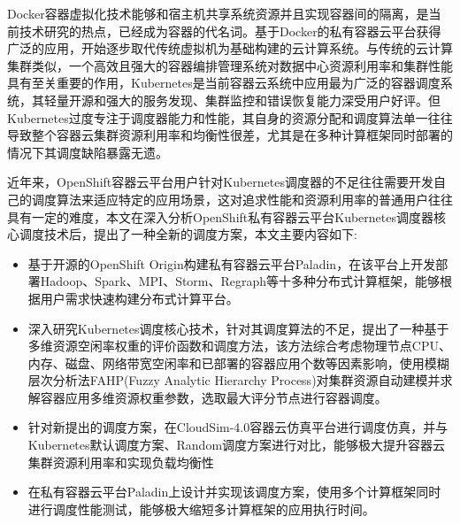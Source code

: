 \begin{cabstract}
  Docker容器虚拟化技术能够和宿主机共享系统资源并且实现容器间的隔离，是当前技术研究的热点，已经成为容器的代名词。基于Docker的私有容器云平台获得广泛的应用，开始逐步取代传统虚拟机为基础构建的云计算系统。与传统的云计算集群类似，一个高效且强大的容器编排管理系统对数据中心资源利用率和集群性能具有至关重要的作用，Kubernetes是当前容器云系统中应用最为广泛的容器调度系统，其轻量开源和强大的服务发现、集群监控和错误恢复能力深受用户好评。但Kubernetes过度专注于调度器能力和性能，其自身的资源分配和调度算法单一往往导致整个容器云集群资源利用率和均衡性很差，尤其是在多种计算框架同时部署的情况下其调度缺陷暴露无遗。

  近年来，OpenShift容器云平台用户针对Kubernetes调度器的不足往往需要开发自己的调度算法来适应特定的应用场景，这对追求性能和资源利用率的普通用户往往具有一定的难度，本文在深入分析OpenShift私有容器云平台Kubernetes调度器核心调度技术后，提出了一种全新的调度方案，本文主要内容如下:
  \begin{itemize}
  \item 基于开源的OpenShift Origin构建私有容器云平台Paladin，在该平台上开发部署Hadoop、Spark、MPI、Storm、Regraph等十多种分布式计算框架，能够根据用户需求快速构建分布式计算平台。
  \item 深入研究Kubernetes调度核心技术，针对其调度算法的不足，提出了一种基于多维资源空闲率权重的评价函数和调度方法，该方法综合考虑物理节点CPU、内存、磁盘、网络带宽空闲率和已部署的容器应用个数等因素影响，使用模糊层次分析法FAHP(Fuzzy Analytic Hierarchy Process)对集群资源自动建模并求解容器应用多维资源权重参数，选取最大评分节点进行容器调度。
  \item 针对新提出的调度方案，在CloudSim-4.0容器云仿真平台进行调度仿真，并与Kubernetes默认调度方案、Random调度方案进行对比，能够极大提升容器云集群资源利用率和实现负载均衡性
  \item 在私有容器云平台Paladin上设计并实现该调度方案，使用多个计算框架同时进行调度性能测试，能够极大缩短多计算框架的应用执行时间。
  \end{itemize}
\end{cabstract}


